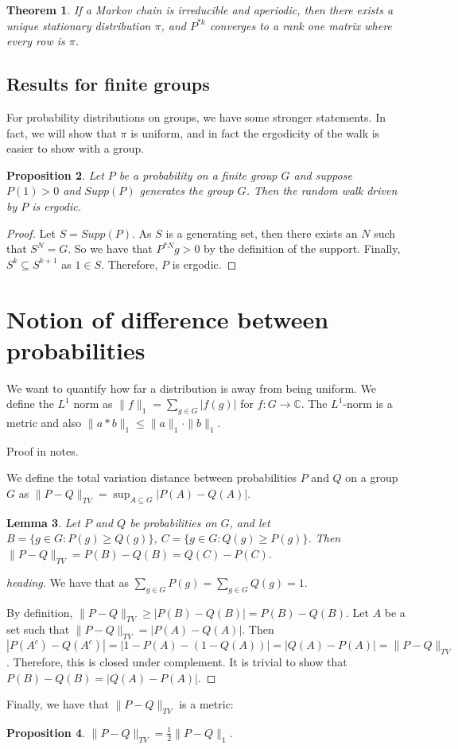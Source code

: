 \documentclass[]{article}
\newtheorem{theorem}{Theorem}
\newtheorem{proposition}[theorem]{Proposition}
\newtheorem{lemma}[theorem]{Lemma}
\theoremstyle{definition}
\numberwithin{theorem}{section}
\numberwithin{equation}{section}
\begin{document}
\begin{theorem}
	If a Markov chain is irreducible and aperiodic, then there exists a unique stationary distribution $\pi$, and $P^{*k}$ converges to a rank one matrix where every row is $\pi$. 
\end{theorem}


\subsection{Results for finite groups}
For probability distributions on groups, we have some stronger statements. In fact, we will show that $\pi$ is uniform, and in fact the ergodicity of the walk is easier to show with a group. 
\begin{proposition}
	Let $P$ be a probability on a finite group $G$ and suppose $P(1) > 0$ and $Supp(P)$ generates the group $G$. Then the random walk driven by $P$ is ergodic.
\end{proposition}

\begin{proof}
	Let $S = Supp(P)$. As $S$ is a generating set, then there exists an $N$ such that $S^N = G$. So we have that $P^{\ast N} g > 0$ by the definition of the support. Finally, $S^{k} \subseteq S^{k + 1}$ as $1 \in S$. Therefore, $P$ is ergodic. 
\end{proof}

\section{Notion of difference between probabilities}
We want to quantify how far a distribution is away from being uniform. We define the $L^1$ norm as $\|f\|_1 = \sum_{g \in G} |f(g)|$ for $f : G \rightarrow \mathbb{C}$. The $L^1$-norm is a metric and also $\|a \ast b\|_1 \leq \|a\|_1 \cdot \|b\|_1$. 

Proof in notes.

We define the total variation distance between probabilities $P$ and $Q$ on a group $G$ as $\| P - Q\|_{TV} = \sup_{A \subseteq G} |P(A) - Q(A)|$. 

\begin{lemma}
	Let $P$ and $Q$ be probabilities on $G$, and let $B = \lbrace g \in G : P(g) \geq Q(g) \rbrace$, $C = \lbrace g \in G : Q(g) \geq P(g) \rbrace$.
	Then $\|P - Q \|_{TV} = P(B) - Q(B) = Q(C) - P(C)$.
\end{lemma}
\begin{proof}[heading]
	We have that as $\sum_{g \in G} P(g) = \sum_{g \in G} Q(g) = 1$. 
	
	
	By definition, $\|P - Q\|_{TV} \geq |P(B) - Q(B)| = P(B) - Q(B)$.
	Let $A$ be a set such that $\|P - Q\|_{TV} = |P(A) - Q(A)|.$ Then $|P(A^c) - Q(A^c)| = |1 - P(A) - (1 - Q(A))| = |Q(A) - P(A)| = \|P - Q \|_{TV}$. Therefore, this is closed under complement. It is trivial to show that $P(B) - Q(B) = |Q(A) - P(A)|$. 
\end{proof}
Finally, we have that $\|P - Q \|_{TV}$ is a metric:
\begin{proposition}
	\label{prop:distribution difference equality}
	$\|P - Q\|_{TV} = \frac{1}{2} \|P - Q \|_1$. 
\end{proposition}
\end{document}
